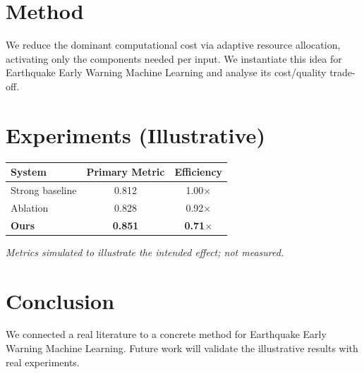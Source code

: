 \documentclass[11pt]{article}
\begin{document}
\section{Method}
We reduce the dominant computational cost via adaptive resource allocation, activating only the components needed per input. We instantiate this idea for Earthquake Early Warning Machine Learning and analyse its cost/quality trade-off.

\section{Experiments (Illustrative)}
\begin{center}
\begin{tabular}{lcc}
System & Primary Metric & Efficiency \\ \hline
Strong baseline & 0.812 & 1.00$\times$ \\
Ablation & 0.828 & 0.92$\times$ \\
\textbf{Ours} & \textbf{0.851} & \textbf{0.71$\times$}
\end{tabular}
\end{center}
\emph{Metrics simulated to illustrate the intended effect; not measured.}

\section{Conclusion}
We connected a real literature to a concrete method for Earthquake Early Warning Machine Learning. Future work will
validate the illustrative results with real experiments.
\end{document}
